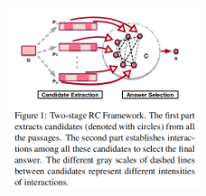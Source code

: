 \documentclass[a4paper,UTF8]{article}
\numberwithin{equation}{section}
\begin{document}
\begin{figure}[H]
	\centering
	\includegraphics[width=0.5\textwidth]{12-1.png}
\end{figure}
\begin{figure}[htbp]
	\centering

	\quad
	\quad
\end{figure}

\newpage
\end{document}
